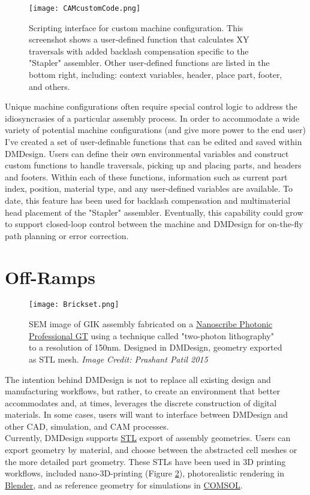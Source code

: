 {\begin{figure}
  \texttt{[image: CAMcustomCode.png]}
  \caption{Scripting interface for custom machine configuration.  This screenshot shows a user-defined function that calculates XY traversals with added backlash compensation specific to the "Stapler" assembler.  Other user-defined functions are listed in the bottom right, including: context variables, header, place part, footer, and others.}
  \label{fig:CAMcustomCode}
\end{figure}

Unique machine configurations often require special control logic to address the idiosyncrasies of a particular assembly process.  In order to accommodate a wide variety of potential machine configurations (and give more power to the end user) I've created a set of user-definable functions that can be edited and saved within DMDesign.  Users can define their own environmental variables and construct custom functions to handle traversals, picking up and placing parts, and headers and footers.  Within each of these functions, information such as current part index, position, material type, and any user-defined variables are available.  To date, this feature has been used for backlash compensation and multimaterial head placement of the "Stapler" assembler.  Eventually, this capability could grow to support closed-loop control between the machine and DMDesign for on-the-fly path planning or error correction.\\

\section{Off-Ramps}

\begin{figure}
  \texttt{[image: Brickset.png]}
  \caption{SEM image of GIK assembly fabricated on a \href{http://www.nanoscribe.de/en/products/photonic-professional-gt/}{Nanoscribe Photonic Professional GT} using a technique called "two-photon lithography" to a resolution of 150nm.  Designed in DMDesign, geometry exported as STL mesh.  \textit{Image Credit: Prashant Patil 2015}}
  \label{fig:BrickSet}
\end{figure}

The intention behind DMDesign is not to replace all existing design and manufacturing workflows, but rather, to create an environment that better accommodates and, at times, leverages the discrete construction of digital materials.  In some cases, users will want to interface between DMDesign and other CAD, simulation, and CAM processes.\\

Currently, DMDesign supports \href{https://en.wikipedia.org/wiki/STL_(file_format)}{STL} export of assembly geometries.  Users can export geometry by material, and choose between the abstracted cell meshes or the more detailed part geometry.  These STLs have been used in 3D printing workflows, included nano-3D-printing (Figure \ref{fig:BrickSet}), photorealistic rendering in \href{https://www.blender.org/}{Blender}, and as reference geometry for simulations in \href{https://www.comsol.com/}{COMSOL}.

}
